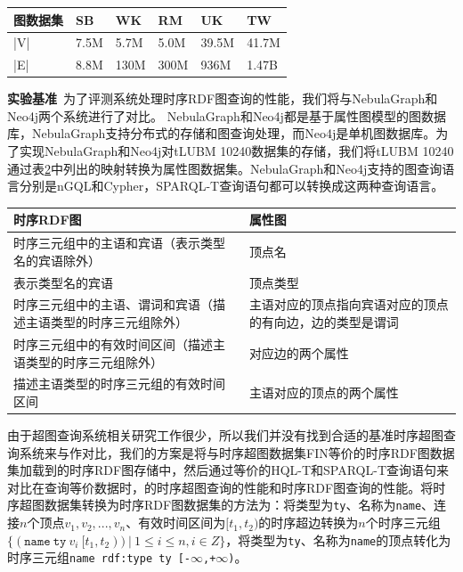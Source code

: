 \begin{table}[!hpt]
  \label{tab:dataset}
  \centering
  \begin{tabular}{p{2cm}p{1cm}p{1cm}p{1cm}p{1cm}p{1cm}} \toprule
    \textbf{图数据集}\centering & \textbf{SB} & \textbf{WK} & \textbf{RM} & \textbf{UK} & \textbf{TW} \\ \midrule
    |V|\centering & 7.5M & 5.7M & 5.0M & 39.5M & 41.7M \\
    |E|\centering & 8.8M & 130M & 300M & 936M & 1.47B \\
    \bottomrule
  \end{tabular}
\end{table}

\noindent\textbf{实验基准}\
为了评测系统处理时序RDF图查询的性能，我们将\sys 与NebulaGraph和Neo4j两个系统进行了对比。
NebulaGraph和Neo4j都是基于属性图模型的图数据库，NebulaGraph支持分布式的存储和图查询处理，而Neo4j是单机图数据库。为了实现NebulaGraph和Neo4j对tLUBM 10240数据集的存储，我们将tLUBM 10240通过表\ref{tab:rdf2prop}中列出的映射转换为属性图数据集。NebulaGraph和Neo4j支持的图查询语言分别是nGQL和Cypher，SPARQL-T查询语句都可以转换成这两种查询语言。

\begin{table}[!hpt]
  \label{tab:rdf2prop}
  \centering
  \begin{tabular}{p{8cm}p{7cm}} \toprule
    \textbf{时序RDF图} & \textbf{属性图} \\ \midrule
    时序三元组中的主语和宾语（表示类型名的宾语除外） & 顶点名 \\
    表示类型名的宾语 & 顶点类型 \\
    时序三元组中的主语、谓词和宾语（描述主语类型的时序三元组除外） & 主语对应的顶点指向宾语对应的顶点的有向边，边的类型是谓词 \\
    时序三元组中的有效时间区间（描述主语类型的时序三元组除外） & 对应边的两个属性 \\
    描述主语类型的时序三元组的有效时间区间 & 主语对应的顶点的两个属性 \\
    \bottomrule
  \end{tabular}
\end{table}

由于超图查询系统相关研究工作很少，所以我们并没有找到合适的基准时序超图查询系统来与\sys 作对比，我们的方案是将与时序超图数据集FIN等价的时序RDF图数据集加载到\sys 的时序RDF图存储中，然后通过等价的HQL-T和SPARQL-T查询语句来对比在查询等价数据时，\sys 的时序超图查询的性能和时序RDF图查询的性能。将时序超图数据集转换为时序RDF图数据集的方法为：将类型为\texttt{ty}、名称为\texttt{name}、连接$n$个顶点$v_1,v_2,...,v_n$、有效时间区间为$[t_1,t_2)$的时序超边转换为$n$个时序三元组$\{(\texttt{name} \ \texttt{ty} \ v_i \ [t_1, t_2))\ | \ 1\leq i \leq n,i\in Z\}$，将类型为\texttt{ty}、名称为\texttt{name}的顶点转化为时序三元组\texttt{name rdf:type ty [-$\infty$,+$\infty$)}。

